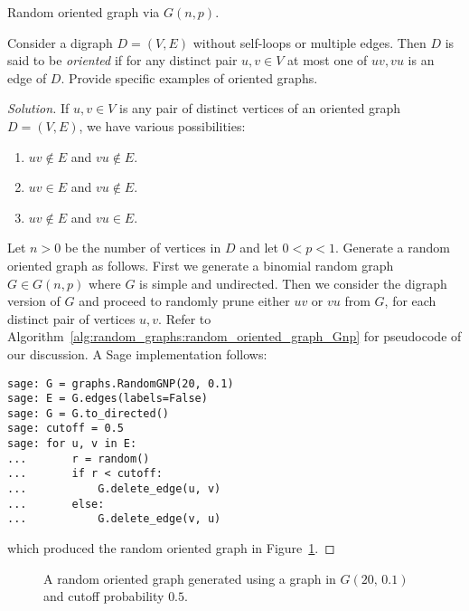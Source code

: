 \begin{algorithm}[!htbp]

\caption{Random oriented graph via $G(n,p)$.}
\label{alg:random_graphs:random_oriented_graph_Gnp}
\end{algorithm}

\begin{example}
\label{eg:random_graphs:random_oriented_graph}
Consider a digraph $D = (V,E)$ without self-loops or multiple
edges. Then $D$ is said to be \emph{oriented} if
for any distinct pair $u,v \in V$ at most one of $uv, vu$ is an edge
of $D$. Provide specific examples of oriented graphs.
\end{example}

\begin{proof}[Solution]
If $u,v \in V$ is any pair of distinct vertices of an oriented graph
$D = (V,E)$, we have various possibilities:
\begin{enumerate}
\item $uv \notin E$ and $vu \notin E$.

\item $uv \in E$ and $vu \notin E$.

\item $uv \notin E$ and $vu \in E$.
\end{enumerate}
Let $n > 0$ be the number of vertices in $D$ and let
$0 < p < 1$. Generate a random oriented graph as follows. First we
generate a binomial random graph $G \in G(n,p)$ where $G$ is simple
and undirected. Then we consider the digraph version of $G$ and
proceed to randomly prune either $uv$ or $vu$ from $G$, for each
distinct pair of vertices $u,v$. Refer to
Algorithm~\ref{alg:random_graphs:random_oriented_graph_Gnp} for
pseudocode of our discussion. A Sage implementation follows:
\begin{lstlisting}
sage: G = graphs.RandomGNP(20, 0.1)
sage: E = G.edges(labels=False)
sage: G = G.to_directed()
sage: cutoff = 0.5
sage: for u, v in E:
...       r = random()
...       if r < cutoff:
...           G.delete_edge(u, v)
...       else:
...           G.delete_edge(v, u)
\end{lstlisting}
which produced the random oriented graph in
Figure~\ref{fig:random_graphs:random_oriented_graph}.
\end{proof}

\begin{figure}[!htbp]
\centering
{}

\caption{A random oriented graph generated using a graph in
  $G(20,\, 0.1)$ and cutoff probability $0.5$.}
\label{fig:random_graphs:random_oriented_graph}
\end{figure}

